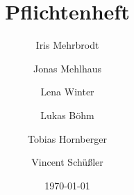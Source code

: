 \documentclass{scrartcl}
\begin{document}
\title{Pflichtenheft}
\author{
	Iris Mehrbrodt\and
	Jonas Mehlhaus\and
	Lena Winter\and
	Lukas Böhm\and
	Tobias Hornberger\and
	Vincent Schüßler
}
\date{\today}
\maketitle

\tableofcontents










\end{document}

